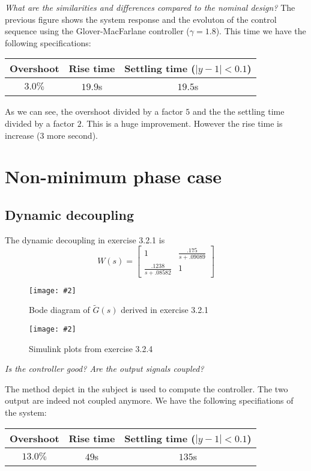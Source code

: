 \documentclass[a4paper,11pt]{article}
\newcommand{\image}[3][width=.8\columnwidth]{
	\begin{figure}[h!]
		\centering
	    \texttt{[image: \#2]}
		\caption{#3}
		\label{fig:#2}
	\end{figure}
}
\begin{document}
    \emph{What are the similarities and differences compared to the nominal design?}
    The previous figure shows the system response and the evoluton of the control sequence using the Glover-MacFarlane controller ($\gamma = 1.8$).
    This time we have the following specifications:
    \begin{center}
    \begin{tabular}{|c|c|c|}
        \hline
        Overshoot & Rise time & Settling time ($|y - 1| < 0.1$)\\
        \hline
        $3.0\%$ & $19.9$s & $19.5$s \\
        \hline
    \end{tabular}
    \end{center}
    As we can see, the overshoot divided by a factor $5$ and the the settling time divided by a factor $2$. This is a huge improvement. However the rise time is increase ($3$ more second).
    

	\section*{Non-minimum phase case}

	\subsection*{Dynamic decoupling}
	The dynamic decoupling in exercise 3.2.1 is
	\[
        W(s) = \left[\begin{array}{cc} 
                1 & \frac{.175}{s + .09089} \\
    \frac{.1238}{s + .08582} & 1 \end{array} \right]
	\]

	\image{fig/figure_4.eps}{Bode diagram of $\tilde{G}(s)$ derived in exercise 3.2.1}
	\image{fig/figure_5.eps}{Simulink plots from exercise 3.2.4}

    \emph{Is the controller good?	Are the output signals coupled?}

    The method depict in the subject is used to compute the controller. The two output are indeed not coupled anymore. 
    We have the following specifiations of the system:
    \begin{center}
    \begin{tabular}{|c|c|c|}
        \hline
        Overshoot & Rise time & Settling time ($|y - 1| < 0.1$)\\
        \hline
        $13.0\%$ & $49$s & $135$s \\
        \hline
    \end{tabular}
    \end{center}
\end{document}
